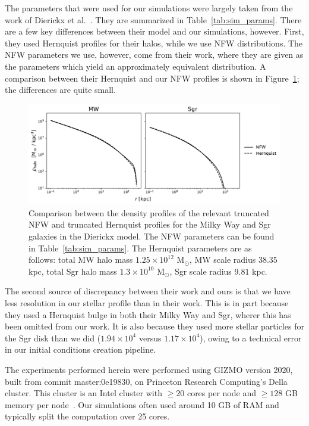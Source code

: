 The parameters that were used for our simulations were largely taken from the
work of Dierickx et al.~\cite{dierickx_predicted_2017}. They are summarized in
Table~\ref{tab:sim_params}. There are a few key differences between their model
and our simulations, however. First, they used Hernquist profiles for their
halos, while we use NFW distributions. The NFW parameters we use, however, come
from their work, where they are given as the parameters which yield an
approximately equivalent distribution. A comparison between their Hernquist
and our NFW profiles is shown in Figure~\ref{fig:nfw_vs_hernquist}; the
differences are quite small.

\begin{figure}
    \centering
    \includegraphics[width=0.9\linewidth]{figs/nfw_vs_hernquist.pdf}
    \caption{%
        Comparison between the density profiles of the relevant truncated NFW
        and truncated Hernquist profiles for the Milky Way and Sgr galaxies in
        the Dierickx model. The NFW parameters can be found in
        Table~\ref{tab:sim_params}. The Hernquist parameters are as follows:
        total MW halo mass $1.25 \times 10^{12}$ M$_\odot$, MW scale radius
        $38.35$ kpc, total Sgr halo mass $1.3 \times 10^{10}$ M$_\odot$, Sgr
        scale radius $9.81$ kpc.
    }
    \label{fig:nfw_vs_hernquist}
\end{figure}

The second source of discrepancy between their work and ours is that we have
less resolution in our stellar profile than in their work. This is in part
because they used a Hernquist bulge in both their Milky Way and Sgr, wherer this
has been omitted from our work. It is also because they used more stellar
particles for the Sgr disk than we did ($1.94 \times 10^4$ versus $1.17 \times
10^4$), owing to a technical error in our initial conditions creation
pipeline.

The experiments performed herein were performed using GIZMO version
2020, built from commit master:0e19830, on Princeton Research Computing's
Della cluster.  This cluster is an Intel cluster with $\geq 20$ cores per node
and $\geq 128$ GB memory per
node~\cite{princeton_research_computing_della_nodate}.  Our simulations often
used around 10 GB of RAM and typically split the computation over 25 cores.

